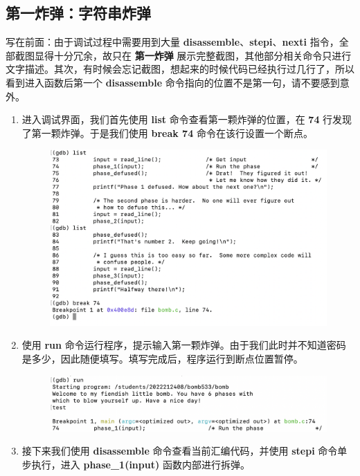     \subsection{第一炸弹：字符串炸弹}
        \par 写在前面：由于调试过程中需要用到大量 \textbf{disassemble}、\textbf{stepi}、\textbf{nexti} 指令，全部截图显得十分冗余，故只在 \textbf{第一炸弹} 展示完整截图，其他部分相关命令只进行文字描述。其次，有时候会忘记截图，想起来的时候代码已经执行过几行了，所以看到进入函数后第一个 \textbf{disassemble} 命令指向的位置不是第一句，请不要感到意外。        \begin{enumerate}
            \item 进入调试界面，我们首先使用 \textbf{list} 命令查看第一颗炸弹的位置，在 \textbf{74} 行发现了第一颗炸弹。于是我们使用 \textbf{break 74} 命令在该行设置一个断点。
                \begin{figure}[htbp]
                    \centering
                    \includegraphics*[width = 12cm]{s1_0.png}
                \end{figure}
            \item 使用 \textbf{run} 命令运行程序，提示输入第一颗炸弹。由于我们此时并不知道密码是多少，因此随便填写。填写完成后，程序运行到断点位置暂停。
                \begin{figure}[htbp]
                    \centering
                    \includegraphics*[width = 12cm]{s1_1.png}
                \end{figure}
            \item 接下来我们使用 \textbf{disassemble} 命令查看当前汇编代码，并使用 \textbf{stepi} 命令单步执行，进入 \textbf{phase\_1(input)} 函数内部进行拆弹。

\end{enumerate}
